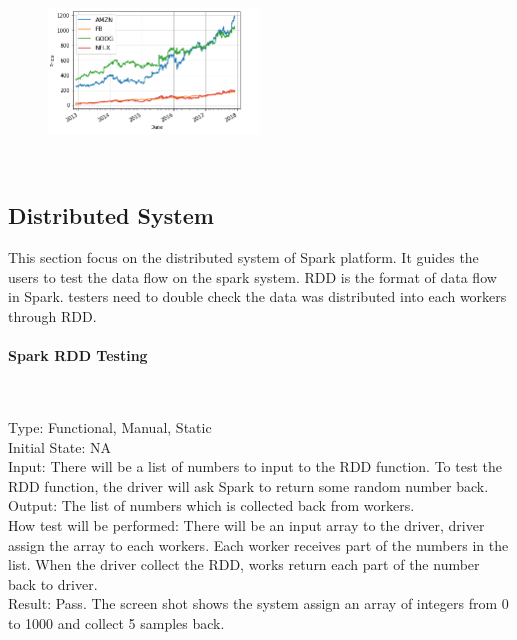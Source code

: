 \documentclass[12pt, titlepage]{article}
\begin{document}
~\newline
\begin{figure}[h!]
\begin{center}
{
\includegraphics[width=0.5\textwidth]{plottest.png}
}
\caption{\label{plot}}
\end{center}
\end{figure}


~\newline

\subsection{Distributed System}
This section focus on the distributed system of Spark platform. It guides the
users to test the data flow on the spark system. RDD is the format of data flow
in Spark. testers need to double check the data was distributed into each
workers through RDD.

\paragraph{ Spark RDD Testing}
~\newline



Type: Functional, Manual, Static\\
Initial State: NA\\
Input: There will be a list of numbers to input to the RDD function. To test the RDD function, the driver will ask Spark to return some random number back. \\
Output: The list of numbers which is collected back from workers.\\
How test will be performed: There will be an input array to the driver, driver assign the array to each workers. Each worker receives part of the numbers in the list. When the driver collect the RDD, works return each part of the number back to driver. \\
Result: Pass. The screen shot shows the system assign an array of integers from 0 to 1000 and collect 5 samples back.
~\newline
\end{document}
